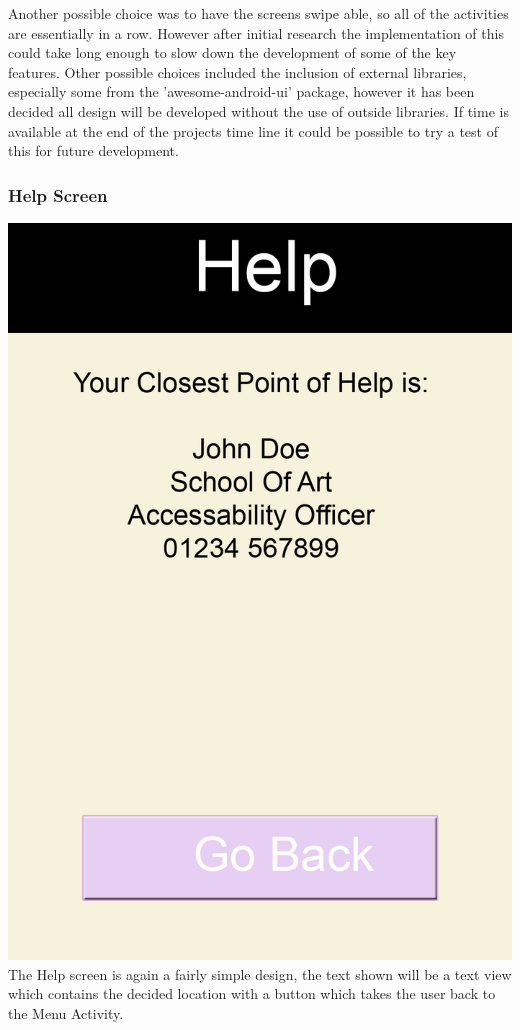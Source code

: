 Another possible choice was to have the screens swipe able, so all of the activities are essentially in a row. However after initial research the implementation of this could take long enough to slow down the development of some of the key features. Other possible choices included the inclusion of external libraries, especially some from the 'awesome-android-ui' package, however it has been decided all design will be developed without the use of outside libraries. If time is available at the end of the projects time line it could be possible to try a test of this for future development. 
\subsubsection{Help Screen}
\includegraphics[scale=0.6]{Design/Help.png} \\
The Help screen is again a fairly simple design, the text shown will be a text view which contains the decided location with a button which takes the user back to the Menu Activity. 
